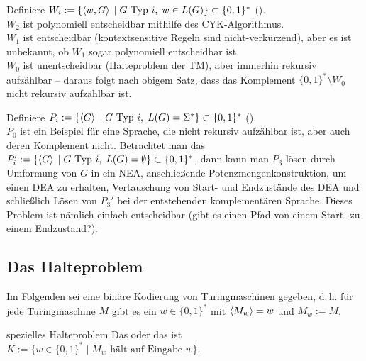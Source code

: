 \begin{Bsp}
    Definiere $W_i := \{\left\langle w, G\right\rangle \;|\; G \text{ Typ } i,\; w \in L(G)\} \subset \{0, 1\}^\ast$
    ().\\
    $W_2$ ist polynomiell entscheidbar mithilfe des CYK-Algorithmus.\\
    $W_1$ ist entscheidbar (kontextsensitive Regeln sind nicht-verkürzend),
    aber es ist unbekannt, ob $W_1$ sogar polynomiell entscheidbar ist.\\
    $W_0$ ist unentscheidbar (Halteproblem der TM), aber immerhin rekursiv aufzählbar --
    daraus folgt nach obigem Satz, dass das Komplement $\{0, 1\}^\ast \setminus W_0$ nicht
    rekursiv aufzählbar ist.
\end{Bsp}

\begin{Bsp}
    Definiere $P_i := \{\left\langle G\right\rangle \;|\; G \text{ Typ } i,\; L(G) = \Sigma^\ast\} \subset
    \{0, 1\}^\ast$ ().\\
    $P_0$ ist ein Beispiel für eine Sprache, die nicht rekursiv aufzählbar ist,
    aber auch deren Komplement nicht.
    Betrachtet man das 
    $P_i' := \{\left\langle G\right\rangle \;|\; G \text{ Typ } i,\; L(G) = \emptyset\} \subset \{0, 1\}^\ast$,
    dann kann man $P_3$ lösen durch Umformung von $G$ in ein NEA, anschließende
    Potenzmengenkonstruktion, um einen DEA zu erhalten, Vertauschung von Start- und Endzustände
    des DEA und schließlich Lösen von $P_3'$ bei der entstehenden komplementären Sprache.
    Dieses Problem ist nämlich einfach entscheidbar (gibt es einen Pfad von einem Start- zu einem
    Endzustand?).
\end{Bsp}

\pagebreak

\subsection{%
    Das Halteproblem%
}

\begin{Bem}
    Im Folgenden sei eine binäre Kodierung von Turingmaschinen gegeben, d.\,h.
    für jede Turingmaschine $M$ gibt es ein $w \in \{0, 1\}^\ast$
    mit $\left\langle M_w\right\rangle = w$ und $M_w := M$.
\end{Bem}

\linie

\begin{Def}{spezielles Halteproblem}
    Das  oder das  ist
    $K := \{w \in \{0, 1\}^\ast \;|\; M_w \text{ hält auf Eingabe } w\}$.
\end{Def}

